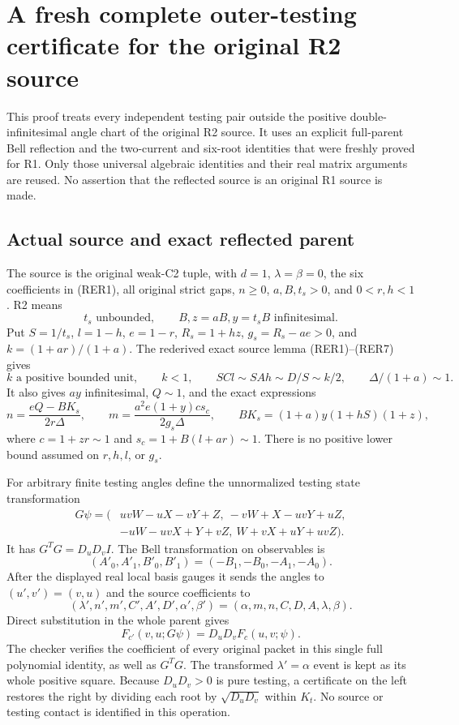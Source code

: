 \section{A fresh complete outer-testing certificate for the original R2 source}
\label{sec:r2-rederived-outer-join}

This proof treats every independent testing pair outside the positive
double-infinitesimal angle chart of the original R2 source.  It uses an
explicit full-parent Bell reflection and the two-current and six-root
identities that were freshly proved for R1.  Only those universal algebraic
identities and their real matrix arguments are reused.  No assertion that
the reflected source is an original R1 source is made.

\subsection{Actual source and exact reflected parent}

The source is the original weak-C2 tuple, with $d=1$, $\lambda=\beta=0$,
the six coefficients in (RER1), all original strict gaps, $n\geq0$,
$a,B,t_s>0$, and $0<r,h<1$.  R2 means
\[
t_s\text{ unbounded},\qquad B, z=aB, y=t_sB\text{ infinitesimal}.
\tag{R2O1}
\]
Put $S=1/t_s$, $l=1-h$, $e=1-r$, $R_s=1+hz$,
$g_s=R_s-ae>0$, and $k=(1+ar)/(1+a)$.  The rederived exact source
lemma (RER1)--(RER7) gives
\[
k\text{ a positive bounded unit},\qquad k<1,\qquad
SC l\sim SAh\sim D/S\sim k/2,
\qquad \Delta/(1+a)\sim1.
\tag{R2O2}
\]
It also gives $ay$ infinitesimal, $Q\sim1$, and the exact expressions
\[
n=\frac{eQ-BK_s}{2r\Delta},\qquad
m=\frac{a^2e(1+y)c s_c}{2g_s\Delta},\qquad
BK_s=(1+a)y(1+hS)(1+z),
\tag{R2O3}
\]
where $c=1+zr\sim1$ and $s_c=1+B(l+ar)\sim1$.
There is no positive lower bound assumed on $r,h,l$, or $g_s$.

For arbitrary finite testing angles define the unnormalized testing
state transformation
\[
\begin{split}
G\psi=(&uvW-uX-vY+Z,\ -vW+X-uvY+uZ,\\
       &-uW-uvX+Y+vZ,\ W+vX+uY+uvZ).
\end{split}
\tag{R2O4}
\]
It has $G^TG=D_uD_v I$.  The Bell transformation on observables is
\[
(A'_0,A'_1,B'_0,B'_1)=(-B_1,-B_0,-A_1,-A_0).
\]
After the displayed real local basis gauges it sends the angles to
$(u',v')=(v,u)$ and the source coefficients to
\[
(\lambda',n',m',C',A',D',\alpha',\beta')
 =(\alpha,m,n,C,D,A,\lambda,\beta).
\tag{R2O5}
\]
Direct substitution in the whole parent gives
\[
F_{c'}(v,u;G\psi)=D_uD_v F_c(u,v;\psi).
\tag{R2O6}
\]
The checker verifies the coefficient of every original packet in this
single full polynomial identity, as well as $G^TG$.  The transformed
$\lambda'=\alpha$ event is kept as its whole positive square.
Because $D_uD_v>0$ is pure testing, a certificate on the left restores
the right by dividing each root by $\sqrt{D_uD_v}$ within $K_t$.
No source or testing contact is identified in this operation.

